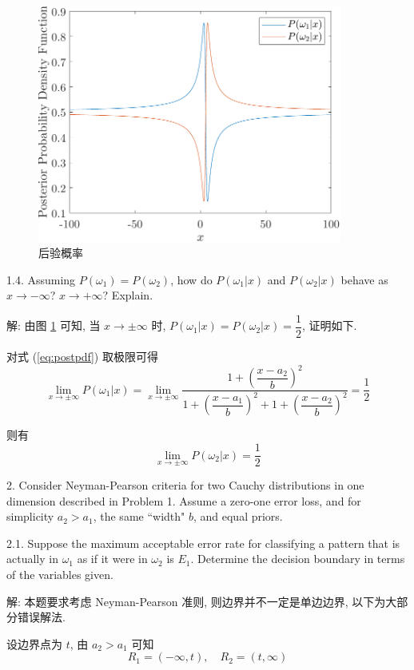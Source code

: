 \documentclass{article}
\begin{document}
\begin{figure}
  \centering
  \includegraphics[width=10cm]{postpdf.pdf}
  \caption{后验概率}
  \label{fig:postpdf}
\end{figure}

1.4. Assuming $P(\omega_1) = P(\omega_2)$, how do $P(\omega_1|x)$ and $P(\omega_2|x)$ behave as $x \rightarrow -\infty$? $x\rightarrow +\infty$? Explain.

解: 由图 \ref{fig:postpdf} 可知, 当 $x \rightarrow \pm\infty$ 时, $P(\omega_1|x)=P(\omega_2|x)=\dfrac{1}{2}$, 证明如下.

对式 (\ref{eq:postpdf}) 取极限可得
\begin{equation}
  \lim_{x\to\pm\infty}P(\omega_1|x)
  =\lim_{x\to\pm\infty}\frac{1+\left(\dfrac{x-a_2}{b}\right)^2}{1+\left(\dfrac{x-a_1}{b}\right)^2+1+\left(\dfrac{x-a_2}{b}\right)^2}=\frac{1}{2}
\end{equation}

则有
\begin{equation}
  \lim_{x\to\pm\infty}P(\omega_2|x)
  =\frac{1}{2}
\end{equation}

2. Consider Neyman-Pearson criteria for two Cauchy distributions in one dimension described in Problem 1. Assume a zero-one error loss, and for simplicity $a_{2}>a_{1}$, the same ``width" $b$, and equal priors.

2.1. Suppose the maximum acceptable error rate for classifying a pattern that is actually in $\omega_{1}$ as if it were in $\omega_{2}$ is $E_{1}$. Determine the decision boundary in terms of the variables given.

解: 本题要求考虑 Neyman-Pearson 准则, 则边界并不一定是单边边界, 以下为大部分错误解法. 

设边界点为 $t$, 由 $a_{2}>a_{1}$ 可知
\begin{equation}
  R_1=(-\infty,t),\quad R_2=(t,\infty)
\end{equation}
\end{document}
